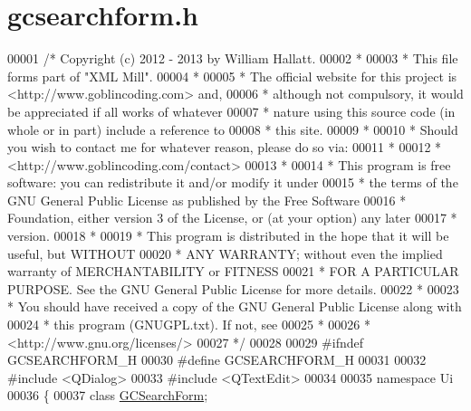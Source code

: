 \hypertarget{gcsearchform_8h_source}{\section{gcsearchform.\-h}
}

\begin{DoxyCode}
00001 \textcolor{comment}{/* Copyright (c) 2012 - 2013 by William Hallatt.}
00002 \textcolor{comment}{ *}
00003 \textcolor{comment}{ * This file forms part of "XML Mill".}
00004 \textcolor{comment}{ *}
00005 \textcolor{comment}{ * The official website for this project is <http://www.goblincoding.com> and,}
00006 \textcolor{comment}{ * although not compulsory, it would be appreciated if all works of whatever}
00007 \textcolor{comment}{ * nature using this source code (in whole or in part) include a reference to}
00008 \textcolor{comment}{ * this site.}
00009 \textcolor{comment}{ *}
00010 \textcolor{comment}{ * Should you wish to contact me for whatever reason, please do so via:}
00011 \textcolor{comment}{ *}
00012 \textcolor{comment}{ *                 <http://www.goblincoding.com/contact>}
00013 \textcolor{comment}{ *}
00014 \textcolor{comment}{ * This program is free software: you can redistribute it and/or modify it
       under}
00015 \textcolor{comment}{ * the terms of the GNU General Public License as published by the Free
       Software}
00016 \textcolor{comment}{ * Foundation, either version 3 of the License, or (at your option) any later}
00017 \textcolor{comment}{ * version.}
00018 \textcolor{comment}{ *}
00019 \textcolor{comment}{ * This program is distributed in the hope that it will be useful, but WITHOUT}
00020 \textcolor{comment}{ * ANY WARRANTY; without even the implied warranty of MERCHANTABILITY or
       FITNESS}
00021 \textcolor{comment}{ * FOR A PARTICULAR PURPOSE.  See the GNU General Public License for more
       details.}
00022 \textcolor{comment}{ *}
00023 \textcolor{comment}{ * You should have received a copy of the GNU General Public License along with}
00024 \textcolor{comment}{ * this program (GNUGPL.txt).  If not, see}
00025 \textcolor{comment}{ *}
00026 \textcolor{comment}{ *                    <http://www.gnu.org/licenses/>}
00027 \textcolor{comment}{ */}
00028 
00029 \textcolor{preprocessor}{#ifndef GCSEARCHFORM\_H}
00030 \textcolor{preprocessor}{}\textcolor{preprocessor}{#define GCSEARCHFORM\_H}
00031 \textcolor{preprocessor}{}
00032 \textcolor{preprocessor}{#include <QDialog>}
00033 \textcolor{preprocessor}{#include <QTextEdit>}
00034 
00035 \textcolor{keyword}{namespace }Ui
00036 \{
00037   \textcolor{keyword}{class }\hyperlink{class_g_c_search_form}{GCSearchForm};

\end{DoxyCode}

